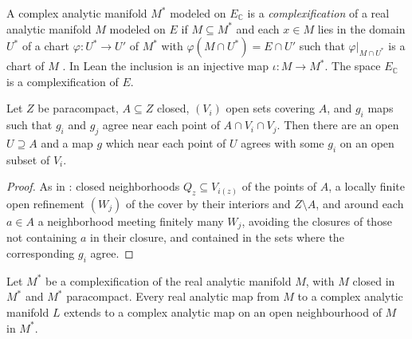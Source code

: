 \begin{definition}[Complexification]
  \label{def:complexification-manifold}
  \leanok
  A complex analytic manifold $M^*$ modeled on $E_{\mathbb{C}}$ is a \emph{complexification} of a real
  analytic manifold $M$ modeled on $E$ if $M \subseteq M^*$ and each $x \in M$ lies in the
  domain $U^*$ of a chart $\varphi \colon U^* \to U'$ of $M^*$ with
  $\varphi(M \cap U^*) = E \cap U'$ such that $\varphi|_{M \cap U^*}$ is a chart of $M$
  \cite[Definition~2.2.18]{GN26}. In Lean the inclusion is an injective map
  $\iota \colon M \to M^*$. The space $E_{\mathbb{C}}$ is a complexification of $E$.
\end{definition}

\begin{lemma}
  \label{lem:paracompact-glue}
  \leanok
  Let $Z$ be paracompact, $A \subseteq Z$ closed, $(V_i)$ open sets covering $A$, and $g_i$ maps
  such that $g_i$ and $g_j$ agree near each point of $A \cap V_i \cap V_j$. Then there are an open
  $U \supseteq A$ and a map $g$ which near each point of $U$ agrees with some $g_i$ on an open
  subset of $V_i$.
\end{lemma}

\begin{proof}
  \leanok
  As in \cite{GN26}: closed neighborhoods $Q_z \subseteq V_{i(z)}$ of the points of $A$, a locally
  finite open refinement $(W_j)$ of the cover by their interiors and $Z \setminus A$, and around
  each $a \in A$ a neighborhood meeting finitely many $W_j$, avoiding the closures of those not
  containing $a$ in their closure, and contained in the sets where the corresponding $g_i$ agree.
\end{proof}

\begin{theorem}
  \label{thm:complexification-extension}
  \leanok
  Let $M^*$ be a complexification of the real analytic manifold $M$, with $M$ closed in $M^*$ and
  $M^*$ paracompact. Every real analytic map from $M$ to a complex analytic manifold $L$ extends
  to a complex analytic map on an open neighbourhood of $M$ in $M^*$.
\end{theorem}

